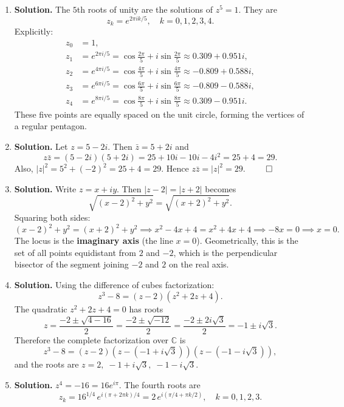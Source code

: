\begin{enumerate}
\item \textbf{Solution.}
The $5$th roots of unity are the solutions of $z^5 = 1$. They are
\[
z_k = e^{2\pi i k/5}, \quad k = 0, 1, 2, 3, 4.
\]
Explicitly:
\begin{align*}
z_0 &= 1, \\
z_1 &= e^{2\pi i/5} = \cos\frac{2\pi}{5} + i\sin\frac{2\pi}{5} \approx 0.309 + 0.951i, \\
z_2 &= e^{4\pi i/5} = \cos\frac{4\pi}{5} + i\sin\frac{4\pi}{5} \approx -0.809 + 0.588i, \\
z_3 &= e^{6\pi i/5} = \cos\frac{6\pi}{5} + i\sin\frac{6\pi}{5} \approx -0.809 - 0.588i, \\
z_4 &= e^{8\pi i/5} = \cos\frac{8\pi}{5} + i\sin\frac{8\pi}{5} \approx 0.309 - 0.951i.
\end{align*}
These five points are equally spaced on the unit circle, forming the vertices of a regular pentagon.

\item \textbf{Solution.}
Let $z = 5 - 2i$. Then $\bar{z} = 5 + 2i$ and
\[
z\bar{z} = (5 - 2i)(5 + 2i) = 25 + 10i - 10i - 4i^2 = 25 + 4 = 29.
\]
Also, $|z|^2 = 5^2 + (-2)^2 = 25 + 4 = 29$. Hence $z\bar{z} = |z|^2 = 29$. $\qed$

\item \textbf{Solution.}
Write $z = x + iy$. Then $|z - 2| = |z + 2|$ becomes
\[
\sqrt{(x-2)^2 + y^2} = \sqrt{(x+2)^2 + y^2}.
\]
Squaring both sides:
\[
(x-2)^2 + y^2 = (x+2)^2 + y^2 \implies x^2 - 4x + 4 = x^2 + 4x + 4 \implies -8x = 0 \implies x = 0.
\]
The locus is the \textbf{imaginary axis} (the line $x = 0$). Geometrically, this is the set of all points equidistant from $2$ and $-2$, which is the perpendicular bisector of the segment joining $-2$ and $2$ on the real axis.

\item \textbf{Solution.}
Using the difference of cubes factorization:
\[
z^3 - 8 = (z - 2)(z^2 + 2z + 4).
\]
The quadratic $z^2 + 2z + 4 = 0$ has roots
\[
z = \frac{-2 \pm \sqrt{4 - 16}}{2} = \frac{-2 \pm \sqrt{-12}}{2} = \frac{-2 \pm 2i\sqrt{3}}{2} = -1 \pm i\sqrt{3}.
\]
Therefore the complete factorization over $\mathbb{C}$ is
\[
z^3 - 8 = (z - 2)(z - (-1 + i\sqrt{3}))(z - (-1 - i\sqrt{3})),
\]
and the roots are $z = 2,\; -1 + i\sqrt{3},\; -1 - i\sqrt{3}$.

\item \textbf{Solution.}
$z^4 = -16 = 16e^{i\pi}$. The fourth roots are
\[
z_k = 16^{1/4}\, e^{i(\pi + 2\pi k)/4} = 2\,e^{i(\pi/4 + \pi k/2)}, \quad k = 0, 1, 2, 3.
\]


\end{enumerate}
